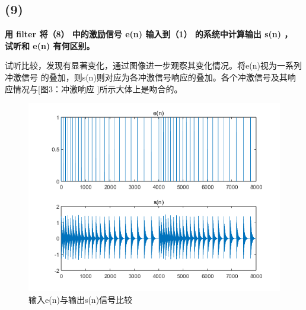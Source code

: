 \documentclass[10pt]{article}
\begin{document}
\subsection*{(9)}
\textbf{\color{gray}用 filter 将（8） 中的激励信号 e(n) 输入到（1） 的系统中计算输出 s(n) ， 试听和
e(n) 有何区别。}

试听比较，发现有显著变化，通过图像进一步观察其变化情况。将e(n)视为一系列冲激信号
的叠加，则s(n)则对应为各冲激信号响应的叠加。各个冲激信号及其响应情况与[图3：冲激响应
]所示大体上是吻合的。
\begin{figure}[h]
	\centering
	\begin{minipage}{0.49\linewidth}
		\centering
		\includegraphics[width=0.9\linewidth]{drawing2-9.png}
		\caption{输入e(n)与输出s(n)信号比较}
	\end{minipage}
\end{figure}
\end{document}
